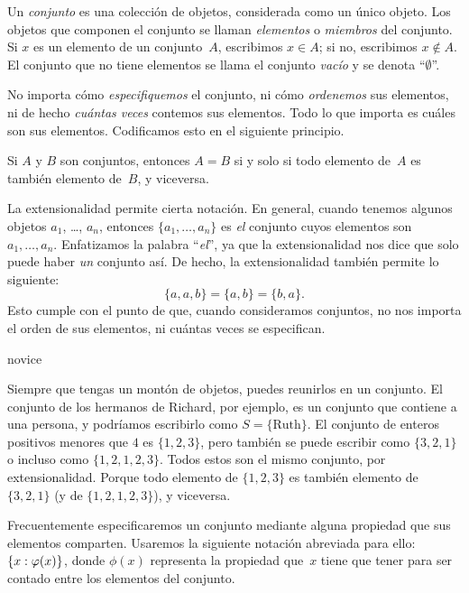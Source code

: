 \documentclass[../../../include/open-logic-section]{subfiles}
\begin{document}

Un \emph{conjunto} es una colección de objetos, considerada como un único objeto. Los objetos que componen el conjunto se llaman \emph{elementos} o \emph{miembros} del conjunto. Si $x$ es un elemento de un conjunto~$A$, escribimos $x \in A$; si no, escribimos $x \notin A$. El conjunto que no tiene elementos se llama el conjunto \emph{vacío} y se denota ``$\emptyset$''.

\begin{explain}
No importa cómo \emph{especifiquemos} el conjunto, ni cómo \emph{ordenemos} sus elementos, ni de hecho \emph{cuántas veces} contemos sus elementos. Todo lo que importa es cuáles son sus elementos. Codificamos esto en el siguiente principio.
\end{explain}

\begin{defn}[Extensionalidad]
 Si $A$ y $B$ son conjuntos, entonces $A = B$ si y solo si
 todo elemento de~$A$ es también elemento de~$B$, y viceversa.
\end{defn}

La extensionalidad permite cierta notación. En general, cuando tenemos algunos objetos $a_{1}$, \dots, $a_{n}$, entonces $\{a_{1}, \dots, a_{n}\}$ es \emph{el} conjunto cuyos elementos son $a_1, \ldots, a_n$. Enfatizamos la palabra ``\emph{el}'', ya que la extensionalidad nos dice que solo puede haber \emph{un} conjunto así. De hecho, la extensionalidad también permite lo siguiente:
\[
 \{a, a, b\} = \{a, b\} = \{b,a\}.
 \]
Esto cumple con el punto de que, cuando consideramos conjuntos, no nos importa el orden de sus elementos, ni cuántas veces se especifican.

\begin{tagblock}{novice}
\begin{ex}
Siempre que tengas un montón de objetos, puedes reunirlos en un conjunto. El conjunto de los hermanos de Richard, por ejemplo, es un conjunto que contiene a una persona, y podríamos escribirlo como $S=\{\textrm{Ruth}\}$. El conjunto de enteros positivos menores que $4$ es $\{1, 2, 3\}$, pero también se puede escribir como $\{3, 2, 1\}$ o incluso como $\{1, 2, 1, 2, 3\}$. Todos estos son el mismo conjunto, por extensionalidad. Porque todo elemento de $\{1, 2, 3\}$ es también elemento de $\{3, 2, 1\}$ (y de $\{1, 2, 1, 2, 3\}$), y viceversa.
\end{ex}
\end{tagblock}

Frecuentemente especificaremos un conjunto mediante alguna propiedad que sus elementos comparten. Usaremos la siguiente notación abreviada para ello: $\{ x : \varphi(x) \}$, donde $\phi(x)$ representa la propiedad que~$x$ tiene que tener para ser contado entre los elementos del conjunto. 
\end{document}
